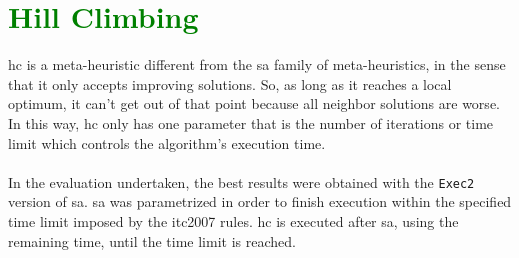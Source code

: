 \section{\textcolor{green}{Hill Climbing}}
\label{sec:HillClimbing}

\gls{hc} is a meta-heuristic different from the \gls{sa} family of meta-heuristics, in the sense that it only accepts improving solutions. So, as long as it reaches a local optimum, it can't get out of that point because all neighbor solutions are worse. In this way, \gls{hc} only has one parameter that is the number of iterations or time limit which controls the algorithm's execution time.\\
\\
In the evaluation undertaken, the best results were obtained with the \verb+Exec2+ version of \gls{sa}. \gls{sa} was parametrized in order to finish execution within the specified time limit imposed by the \gls{itc2007} rules. \gls{hc} is executed after \gls{sa}, using the remaining time, until the time limit is reached.

